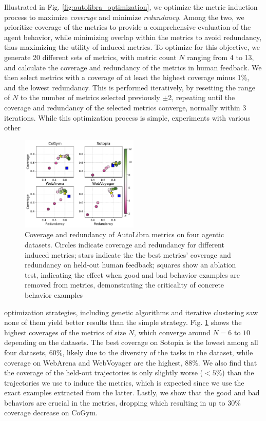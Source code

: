 \documentclass[../main.tex]{subfiles}
\begin{document}
Illustrated in Fig. \ref{fig:autolibra_optimization}, we optimize the metric induction
process to maximize \emph{coverage} and minimize \emph{redundancy}. Among the
two, we prioritize coverage of the metrics to provide a comprehensive evaluation
of the agent behavior, while minimizing overlap within the metrics to avoid
redundancy, thus maximizing the utility of induced metrics. To optimize for this
objective, we generate 20 different sets of metrics, with metric count $N$
ranging from 4 to 13, and calculate the coverage and redundancy of the metrics in
human feedback. We then select metrics with a coverage of at least the highest
coverage minus 1\%, and the lowest redundancy. This is performed iteratively, by
resetting the range of $N$ to the number of metrics selected previously $\pm$2,
repeating until the coverage and redundancy of the selected metrics converge, normally
within 3 iterations. While this optimization process is simple, experiments with
various other
\begin{figure}[!t]
	\centering
	\includegraphics[width=0.5\textwidth]{figs/four_datasets_grid.pdf}
	\caption{Coverage and redundancy of AutoLibra metrics on four agentic datasets.
	Circles indicate coverage and redundancy for different induced metrics; stars
	indicate the the best metrics' coverage and redundancy on held-out human feedback;
	squares show an ablation test, indicating the effect when good and bad behavior
	examples are removed from metrics, demonstrating the criticality of concrete
	behavior examples}
	\label{fig:coverage-redundancy}
\end{figure}
optimization strategies, including genetic algorithms and iterative
clustering saw none of them yield better results than the simple strategy. Fig. \ref{fig:coverage-redundancy}
shows the highest coverages of the metrics of size $N$, which converge around
$N=6$ to $10$ depending on the datasets. The best coverage on Sotopia \citep{zhousotopia}
is the lowest among all four datasets, $60\%$, likely due to the diversity of
the tasks in the dataset, while coverage on WebArena \citep{zhouwebarena} and
WebVoyager \citep{he2024webvoyager} are the highest, $88\%$. We also find that the
coverage of the held-out trajectories is only slightly worse ($<5\%$) than the trajectories
we use to induce the metrics, which is expected since we use the exact examples
extracted from the latter. Lastly, we show that the good and bad behaviors are
crucial in the metrics, dropping which resulting in up to $30\%$ coverage decrease
on CoGym. %
\end{document}
